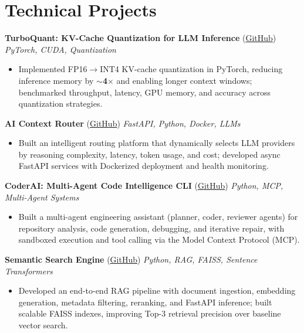 \documentclass[10pt]{article}
\begin{document}

\section*{Technical Projects}

\textbf{TurboQuant: KV-Cache Quantization for LLM Inference} (\href{https://github.com/adityaanilraut/TurboQuant-KV-Cache-Quantization}{GitHub}) \hfill \textit{PyTorch, CUDA, Quantization}
\begin{itemize}
\item Implemented FP16$\rightarrow$INT4 KV-cache quantization in PyTorch, reducing inference memory by \textbf{$\sim$4$\times$} and enabling longer context windows; benchmarked throughput, latency, GPU memory, and accuracy across quantization strategies.
\end{itemize}

\textbf{AI Context Router} (\href{https://github.com/adityaanilraut/AI-Model-Context-Routing}{GitHub}) \hfill \textit{FastAPI, Python, Docker, LLMs}
\begin{itemize}
\item Built an intelligent routing platform that dynamically selects LLM providers by reasoning complexity, latency, token usage, and cost; developed async FastAPI services with Dockerized deployment and health monitoring.
\end{itemize}

\textbf{CoderAI: Multi-Agent Code Intelligence CLI} (\href{https://github.com/adityaanilraut/CoderAI}{GitHub}) \hfill \textit{Python, MCP, Multi-Agent Systems}
\begin{itemize}
\item Built a multi-agent engineering assistant (planner, coder, reviewer agents) for repository analysis, code generation, debugging, and iterative repair, with sandboxed execution and tool calling via the Model Context Protocol (MCP).
\end{itemize}

\textbf{Semantic Search Engine} (\href{https://github.com/adityaanilraut/llm-embedding-pipeline}{GitHub}) \hfill \textit{Python, RAG, FAISS, Sentence Transformers}
\begin{itemize}
\item Developed an end-to-end RAG pipeline with document ingestion, embedding generation, metadata filtering, reranking, and FastAPI inference; built scalable FAISS indexes, improving Top-3 retrieval precision over baseline vector search.
\end{itemize}
\end{document}
